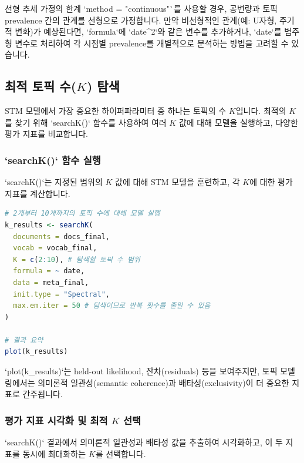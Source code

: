 \documentclass[11pt,a4paper]{article}
\begin{document}
\begin{cautionbox}{선형 추세 가정의 한계}
`method = "continuous"`를 사용할 경우, 공변량과 토픽 prevalence 간의 관계를 선형으로 가정합니다. 만약 비선형적인 관계(예: U자형, 주기적 변화)가 예상된다면, `formula`에 `date^2`와 같은 변수를 추가하거나, `date`를 범주형 변수로 처리하여 각 시점별 prevalence를 개별적으로 분석하는 방법을 고려할 수 있습니다.
\end{cautionbox}

\subsection{최적 토픽 수($K$) 탐색}
STM 모델에서 가장 중요한 하이퍼파라미터 중 하나는 토픽의 수 $K$입니다. 최적의 $K$를 찾기 위해 `searchK()` 함수를 사용하여 여러 $K$ 값에 대해 모델을 실행하고, 다양한 평가 지표를 비교합니다.

\subsubsection{`searchK()` 함수 실행}
`searchK()`는 지정된 범위의 $K$ 값에 대해 STM 모델을 훈련하고, 각 $K$에 대한 평가 지표를 계산합니다.

\begin{lstlisting}[language=R, caption={최적 토픽 수 탐색 (`searchK`)}, label={lst:search_k}]
# 2개부터 10개까지의 토픽 수에 대해 모델 실행
k_results <- searchK(
  documents = docs_final,
  vocab = vocab_final,
  K = c(2:10), # 탐색할 토픽 수 범위
  formula = ~ date,
  data = meta_final,
  init.type = "Spectral",
  max.em.iter = 50 # 탐색이므로 반복 횟수를 줄일 수 있음
)

# 결과 요약
plot(k_results)
\end{lstlisting}
`plot(k_results)`는 held-out likelihood, 잔차(residuals) 등을 보여주지만, 토픽 모델링에서는 의미론적 일관성(semantic coherence)과 배타성(exclusivity)이 더 중요한 지표로 간주됩니다.

\subsubsection{평가 지표 시각화 및 최적 $K$ 선택}
`searchK()` 결과에서 의미론적 일관성과 배타성 값을 추출하여 시각화하고, 이 두 지표를 동시에 최대화하는 $K$를 선택합니다.
\end{document}
